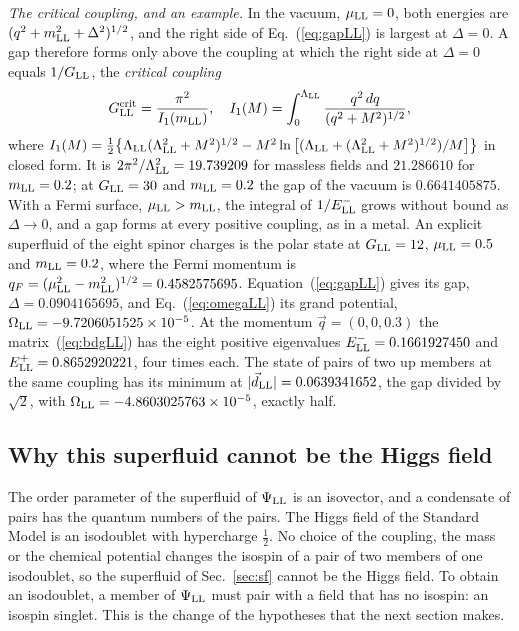 \documentclass[aps,prd,twocolumn,superscriptaddress,nofootinbib,floatfix,longbibliography]{revtex4-2}
\newcommand{\LL}{{\rm LL}}
\begin{document}
\emph{The critical coupling, and an example.} In the vacuum, $\mu_\LL=0$, both energies are
$(q^2+m_\LL^2+\Delta^2)^{1/2}$, and the right side of Eq.~(\ref{eq:gapLL}) is largest at $\Delta=0$. A gap therefore forms
only above the coupling at which the right side at $\Delta=0$ equals $1/G_\LL$, the \emph{critical coupling}
\begin{equation}
G^{\rm crit}_\LL=\frac{\pi^2}{I_1(m_\LL)},\quad I_1(M)=\int_0^{\Lambda_\LL}\frac{q^2\,dq}{(q^2+M^2)^{1/2}} ,
\label{eq:gcritLL}
\end{equation}
where $I_1(M)=\frac12\big\{\Lambda_\LL(\Lambda_\LL^2+M^2)^{1/2}-M^2\ln\big[(\Lambda_\LL+(\Lambda_\LL^2+M^2)^{1/2})/M\big]\big\}$
in closed form. It is $2\pi^2/\Lambda_\LL^2=19.739209$ for massless fields and $21.286610$ for
$m_\LL=0.2$; at
$G_\LL=30$ and $m_\LL=0.2$ the gap of the vacuum is $0.6641405875$. With a Fermi surface, $\mu_\LL>m_\LL$, the
integral of $1/E^-_\LL$ grows without bound as $\Delta\to0$, and a gap forms at every positive coupling, as in a metal. An
explicit superfluid of the eight spinor charges is the polar state at $G_\LL=12$, $\mu_\LL=0.5$ and $m_\LL=0.2$, where the
Fermi momentum is $q_F=(\mu_\LL^2-m_\LL^2)^{1/2}=0.4582575695$. Equation~(\ref{eq:gapLL}) gives its gap,
$\Delta=0.0904165695$, and Eq.~(\ref{eq:omegaLL}) its grand potential, $\Omega_\LL=-9.7206051525\times10^{-5}$.
At the momentum $\vec q=(0,0,0.3)$ the matrix~(\ref{eq:bdgLL}) has the eight positive eigenvalues
$E^-_\LL=0.1661927450$ and $E^+_\LL=0.8652920221$, four times each. The state of pairs of
two up members at the same coupling has its minimum at $|\vec d_\LL|=0.0639341652$, the gap divided by
$\sqrt2$, with $\Omega_\LL=-4.8603025763\times10^{-5}$, exactly half.

\subsection{Why this superfluid cannot be the Higgs field}
\label{sec:notHiggs}

The order parameter of the superfluid of $\Psi_\LL$ is an isovector, and a condensate of pairs has the quantum numbers of
the pairs. The Higgs field of the Standard Model is an isodoublet with hypercharge $\frac12$. No choice of the coupling,
the mass or the chemical potential changes the isospin of a pair of two members of one isodoublet, so the superfluid of
Sec.~\ref{sec:sf} cannot be the Higgs field. To obtain an isodoublet, a member of $\Psi_\LL$ must pair with a field that
has no isospin: an isospin singlet. This is the change of the hypotheses that the next section makes.
\end{document}
